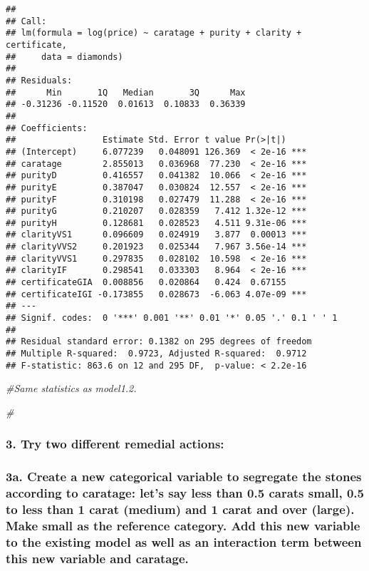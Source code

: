 \documentclass[]{article}
\newenvironment{Shaded}{\begin{snugshade}}{\end{snugshade}}
\newcommand{\CommentTok}[1]{\textcolor[rgb]{0.56,0.35,0.01}{\textit{#1}}}
\begin{document}
\begin{verbatim}
## 
## Call:
## lm(formula = log(price) ~ caratage + purity + clarity + certificate, 
##     data = diamonds)
## 
## Residuals:
##      Min       1Q   Median       3Q      Max 
## -0.31236 -0.11520  0.01613  0.10833  0.36339 
## 
## Coefficients:
##                 Estimate Std. Error t value Pr(>|t|)    
## (Intercept)     6.077239   0.048091 126.369  < 2e-16 ***
## caratage        2.855013   0.036968  77.230  < 2e-16 ***
## purityD         0.416557   0.041382  10.066  < 2e-16 ***
## purityE         0.387047   0.030824  12.557  < 2e-16 ***
## purityF         0.310198   0.027479  11.288  < 2e-16 ***
## purityG         0.210207   0.028359   7.412 1.32e-12 ***
## purityH         0.128681   0.028523   4.511 9.31e-06 ***
## clarityVS1      0.096609   0.024919   3.877  0.00013 ***
## clarityVVS2     0.201923   0.025344   7.967 3.56e-14 ***
## clarityVVS1     0.297835   0.028102  10.598  < 2e-16 ***
## clarityIF       0.298541   0.033303   8.964  < 2e-16 ***
## certificateGIA  0.008856   0.020864   0.424  0.67155    
## certificateIGI -0.173855   0.028673  -6.063 4.07e-09 ***
## ---
## Signif. codes:  0 '***' 0.001 '**' 0.01 '*' 0.05 '.' 0.1 ' ' 1
## 
## Residual standard error: 0.1382 on 295 degrees of freedom
## Multiple R-squared:  0.9723, Adjusted R-squared:  0.9712 
## F-statistic: 863.6 on 12 and 295 DF,  p-value: < 2.2e-16
\end{verbatim}

\begin{Shaded}
\begin{Highlighting}[]
\CommentTok{#Same statistics as model1.2.}

\CommentTok{#}
\end{Highlighting}
\end{Shaded}

\subsubsection{3. Try two different remedial
actions:}\label{try-two-different-remedial-actions}

\subsubsection{3a. Create a new categorical variable to segregate the
stones according to caratage: let's say less than 0.5 carats small, 0.5
to less than 1 carat (medium) and 1 carat and over (large). Make small
as the reference category. Add this new variable to the existing model
as well as an interaction term between this new variable and
caratage.}\label{a.-create-a-new-categorical-variable-to-segregate-the-stones-according-to-caratage-lets-say-less-than-0.5-carats-small-0.5-to-less-than-1-carat-medium-and-1-carat-and-over-large.-make-small-as-the-reference-category.-add-this-new-variable-to-the-existing-model-as-well-as-an-interaction-term-between-this-new-variable-and-caratage.}
\end{document}

